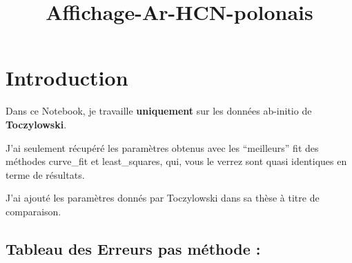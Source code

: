 \documentclass[11pt]{article}
\title{Affichage-Ar-HCN-polonais}
\begin{document}
    
    \maketitle
    
    

    
    \section{Introduction}\label{introduction}

    Dans ce Notebook, je travaille \textbf{uniquement} sur les données
ab-initio de \textbf{Toczylowski}.

J'ai seulement récupéré les paramètres obtenus avec les ``meilleurs''
fit des méthodes curve\_fit et least\_squares, qui, vous le verrez sont
quasi identiques en terme de résultats.

J'ai ajouté les paramètres donnés par Toczylowski dans sa thèse à titre
de comparaison.

    \subsection{Tableau des Erreurs pas méthode
:}\label{tableau-des-erreurs-pas-muxe9thode}
\end{document}
